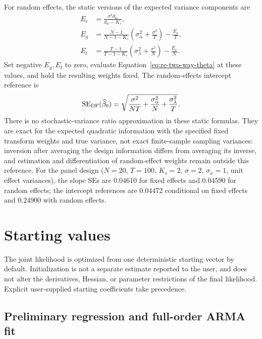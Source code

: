 \documentclass[12pt]{article}
\begin{document}
For random effects, the static versions of the expected variance components are
\begin{equation}
\begin{aligned}
E_e&=\frac{\sigma^2d_w}{d_w-K_s},\\
E_g&=\frac{N-1}{N-1-K_s}\left(\sigma_\alpha^2+\frac{\sigma^2}{T}\right)-\frac{E_e}{T},\\
E_t&=\frac{T-1}{T-1-K_s}\left(\sigma_\lambda^2+\frac{\sigma^2}{N}\right)-\frac{E_e}{N}.
\end{aligned}
\label{eq:df-static-components}
\end{equation}
Set negative $E_g,E_t$ to zero, evaluate Equation~\ref{eq:re-two-way-theta} at these values, and hold the resulting weights fixed. The random-effects intercept reference is
\begin{equation}
\operatorname{SE}_{\rm DF}(\widehat\beta_0)=
\sqrt{\frac{\sigma^2}{NT}+\frac{\sigma_\alpha^2}{N}+\frac{\sigma_\lambda^2}{T}}.
\label{eq:df-static-intercept}
\end{equation}
There is no stochastic-variance ratio approximation in these static formulas. They are exact for the expected quadratic information with the specified fixed transform weights and true variance, not exact finite-sample sampling variances: inversion after averaging the design information differs from averaging its inverse, and estimation and differentiation of random-effect weights remain outside this reference.
For the panel design ($N=20$, $T=100$, $K_s=2$, $\sigma=2$, $\sigma_x=1$, unit effect variances), the slope SEs are $0.04610$ for fixed effects and $0.04590$ for random effects; the intercept references are $0.04472$ conditional on fixed effects and $0.24900$ with random effects.

\section{Starting values}\label{sec:starting-values}

The joint likelihood is optimized from one deterministic starting vector by
default. Initialization is not a separate estimate reported to the user, and
does not alter the derivatives, Hessian, or parameter restrictions of the final
likelihood. Explicit user-supplied starting coefficients take precedence.

\subsection{Preliminary regression and full-order ARMA fit}
\end{document}

